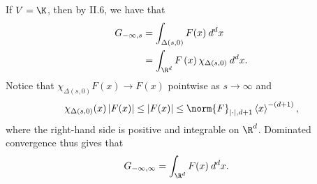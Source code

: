 \documentclass[10pt]{mypackage}
\begin{document}
\begin{solution}
  If $V = \K$, then by II.6, we have that
  \begin{align*}
    G_{-\infty,s} &= \int_{\Delta\left( s,0 \right)}^{} F(x)\:d^{d}x\\
                  &= \int_{\R^d}^{} F\left( x \right)\chi_{\Delta\left( s,0 \right)}\:d^{d}x.
  \end{align*}
  Notice that $\chi_{\Delta\left( s,0 \right)}F(x) \to F(x)$ pointwise as $s\to\infty$ and
  \begin{align*}
    \chi_{\Delta\left( s,0 \right)}(x)\left\vert F(x) \right\vert \leq \left\vert F(x) \right\vert \leq \norm{F}_{\left\vert \cdot \right\vert,d+1} \left\langle x \right\rangle^{-\left( d+1 \right)},
  \end{align*}
  where the right-hand side is positive and integrable on $\R^d$. Dominated convergence thus gives that
  \begin{align*}
    G_{-\infty,\infty} &= \int_{\R^d}^{} F(x)\:d^{d}x.
  \end{align*}
\end{solution}
\end{document}
